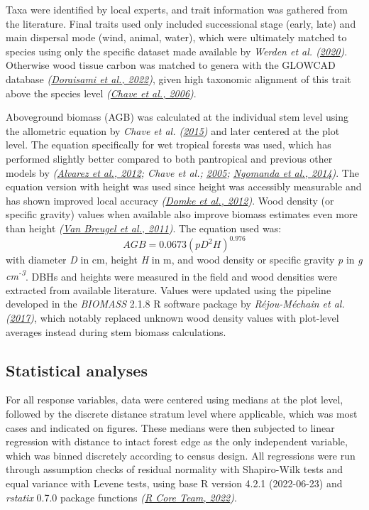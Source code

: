 \documentclass[
  12pt,
]{article}
\begin{document}
Taxa were identified by local experts,
and trait information was gathered from the literature.
Final traits used only included successional stage (early, late) and main dispersal mode (wind, animal, water), which were ultimately matched to species using only the specific dataset made available by \emph{Werden et al. (\protect\hyperlink{ref-werden20}{2020})}.
Otherwise wood tissue carbon was matched to genera with the GLOWCAD database \emph{(\protect\hyperlink{ref-doraisami22}{Doraisami et al., 2022})}, given high taxonomic alignment of this trait above the species level \emph{(\protect\hyperlink{ref-chave06}{Chave et al., 2006})}.

Aboveground biomass (AGB) was calculated at the individual stem level using the allometric equation by \emph{Chave et al. (\protect\hyperlink{ref-chave15}{2015})} and later centered at the plot level.
The equation specifically for wet tropical forests was used, which has performed slightly better compared to both pantropical and previous other models by \emph{(\protect\hyperlink{ref-alvarez12}{Alvarez et al., 2012}; Chave et al.; \protect\hyperlink{ref-chave05}{2005}; \protect\hyperlink{ref-ngomanda14}{Ngomanda et al., 2014})}.
The equation version with height was used since height was accessibly measurable and has shown improved local accuracy \emph{(\protect\hyperlink{ref-domke12}{Domke et al., 2012})}.
Wood density (or specific gravity) values when available also improve biomass estimates even more than height \emph{(\protect\hyperlink{ref-vanbreugel11}{Van Breugel et al., 2011})}.
The equation used was:
\[{AGB} = 0.0673 (p D^2 H)^{0.976}\]
with diameter \emph{D} in cm, height \emph{H} in m, and wood density or specific gravity \emph{p} in \emph{g cm\textsuperscript{-3}}.
DBHs and heights were measured in the field and wood densities were extracted from available literature.
Values were updated using the pipeline developed in the \emph{BIOMASS} 2.1.8 R software package by \emph{Réjou-Méchain et al. (\protect\hyperlink{ref-rejou-mechain17}{2017})}, which notably replaced unknown wood density values with plot-level averages instead during stem biomass calculations.

\hypertarget{statistical-analyses}{%
\subsection{Statistical analyses}\label{statistical-analyses}}

For all response variables, data were centered using medians at the plot level, followed by the discrete distance stratum level where applicable, which was most cases and indicated on figures.
These medians were then subjected to linear regression with distance to intact forest edge as the only independent variable, which was binned discretely according to census design.
All regressions were run through assumption checks of residual normality with Shapiro-Wilk tests and equal variance with Levene tests, using base R version 4.2.1 (2022-06-23) and \emph{rstatix} 0.7.0 package functions \emph{(\protect\hyperlink{ref-base}{R Core Team, 2022})}.
\end{document}
